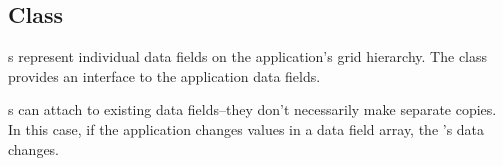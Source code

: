 \documentclass[11pt]{article}
\begin{document}
% 
% 
% 
% 
% 
% 

\subsection{ Class} \label{ss:vector}

   s represent individual data fields on the
   application's grid hierarchy.  The  class provides an
   interface to the application data fields.

   s can attach to existing data fields--they don't
   necessarily make separate copies.  In this case, if the application
   changes values in a data field array, the 's data
   changes.  
\end{document}
